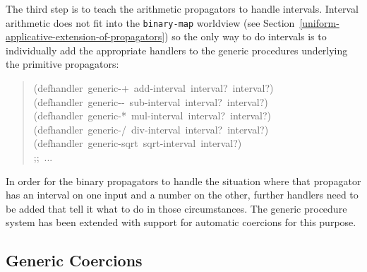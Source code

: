 \documentclass[12pt,letterpaper,english]{article}
\begin{document}
The third step is to teach the arithmetic propagators to handle
intervals.  Interval arithmetic does not fit into the \texttt{binary-map}
worldview (see Section~\ref{uniform-applicative-extension-of-propagators})
so the only way to do intervals is to
individually add the appropriate handlers to the generic procedures
underlying the primitive propagators:
\begin{quote}{\ttfamily \raggedright \noindent
(defhandler~generic-+~add-interval~interval?~interval?)~\\
(defhandler~generic-{}-~sub-interval~interval?~interval?)~\\
(defhandler~generic-*~mul-interval~interval?~interval?)~\\
(defhandler~generic-/~div-interval~interval?~interval?)~\\
(defhandler~generic-sqrt~sqrt-interval~interval?)~\\
;;~...
}\end{quote}

In order for the binary propagators to handle the situation where that
propagator has an interval on one input and a number on the other,
further handlers need to be added that tell it what to do in those
circumstances.  The generic procedure system has been extended
with support for automatic coercions for this purpose.



\subsection{Generic Coercions}
\label{generic-coercions}
\end{document}
